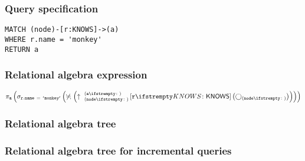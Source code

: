 \subsubsection*{Query specification}

\begin{lstlisting}
MATCH (node)-[r:KNOWS]->(a)
WHERE r.name = 'monkey'
RETURN a
\end{lstlisting}

\subsubsection*{Relational algebra expression}

$\projection{\var{a}} \left(\selection{\mathtt{r.name~=~'monkey'}} \left(\alldifferent{} \left(\expandout{node}{a}{}{r}{KNOWS} \left(\getvertices{node}{}\right)\right)\right)\right)$

\subsubsection*{Relational algebra tree}


\subsubsection*{Relational algebra tree for incremental queries}


